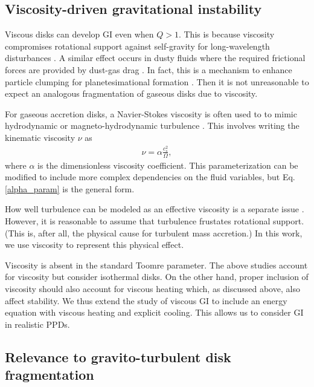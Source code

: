 \documentclass[iop, numberedappendix]{emulateapj}
\begin{document}
\subsection{Viscosity-driven gravitational instability}
Viscous disks can develop GI even when $Q>1$. This is because
viscosity compromises rotational support against self-gravity for
long-wavelength disturbances
\citep{lynden-bell74,willerding92,gammie96}. A similar effect  
occurs in dusty fluids where the required frictional forces are 
provided by dust-gas drag \citep{ward00, takahashi14}. In fact, this
is a mechanism to enhance particle clumping for planetesimational formation 
\citep{youdin11}. Then it is not unreasonable to expect an analogous
fragmentation of gaseous disks due to viscosity.   

For gaseous accretion disks, a Navier-Stokes viscosity is often used to 
to mimic hydrodynamic or magneto-hydrodynamic turbulence
\citep{shakura73}. This involves writing the
kinematic viscosity $\nu$ as  
\begin{align}\label{alpha_param}
  \nu  = \alpha \frac{c_s^2}{\Omega}, %
\end{align}
where $\alpha$ is the dimensionless viscosity
coefficient. This
parameterization can be modified to include more complex dependencies on the
fluid variables, but Eq. \ref{alpha_param} is the general form. 

How well turbulence can be modeled as an effective viscosity is a
separate issue \citep{balbus99}. However, it is  
reasonable to assume that turbulence frustates rotational 
support. (This is, after all, the physical cause for turbulent mass
accretion.) In this work, we use viscosity to represent this physical
effect.  

Viscosity is absent in the standard Toomre parameter. The above
studies account for viscosity but consider isothermal disks. On the
other hand, proper inclusion of viscosity should also account for
viscous heating which, as discussed above, also affect stability. 
We thus extend the study of viscous GI to include an energy equation
with viscous heating and explicit cooling. This allows us to consider
GI in realistic PPDs.  



\subsection{Relevance to gravito-turbulent disk fragmentation}
\end{document}
